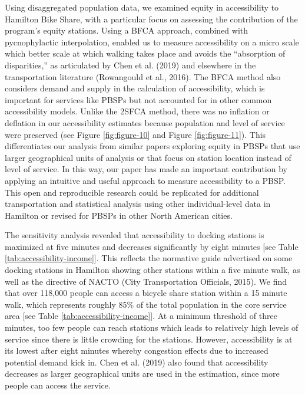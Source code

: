 \documentclass[]{elsarticle} %
\begin{document}
Using disaggregated population data, we examined equity in accessibility
to Hamilton Bike Share, with a particular focus on assessing the
contribution of the program's equity stations. Using a BFCA approach,
combined with pycnophylactic interpolation, enabled us to measure
accessibility on a micro scale which better scale at which walking takes
place and avoids the ``absorption of disparities,'' as articulated by
Chen et al. (2019) and elsewhere in the transportation literature
(Rowangould et al., 2016). The BFCA method also considers demand and
supply in the calculation of accessibility, which is important for
services like PBSPs but not accounted for in other common accessibility
models. Unlike the 2SFCA method, there was no inflation or deflation in
our accessibility estimates because population and level of service were
preserved (see Figure \ref{fig:figure-10} and Figure
\ref{fig:figure-11}). This differentiates our analysis from similar
papers exploring equity in PBSPs that use larger geographical units of
analysis or that focus on station location instead of level of service.
In this way, our paper has made an important contribution by applying an
intuitive and useful approach to measure accessibility to a PBSP. This
open and reproducible research could be replicated for additional
transportation and statistical analysis using other individual-level
data in Hamilton or revised for PBSPs in other North American cities.

The sensitivity analysis revealed that accessibility to docking stations
is maximized at five minutes and decreases significantly by eight
minutes {[}see Table \ref{tab:accessibility-income}{]}. This reflects
the normative guide advertised on some docking stations in Hamilton
showing other stations within a five minute walk, as well as the
directive of NACTO (City Transportation Officials, 2015). We find that
over 118,000 people can access a bicycle share station within a 15
minute walk, which represents roughly 85\% of the total population in
the core service area {[}see Table \ref{tab:accessibility-income}{]}. At
a minimum threshold of three minutes, too few people can reach stations
which leads to relatively high levels of service since there is little
crowding for the stations. However, accessibility is at its lowest after
eight minutes whereby congestion effects due to increased potential
demand kick in. Chen et al. (2019) also found that accessibility
decreases as larger geographical units are used in the estimation, since
more people can access the service.
\end{document}
